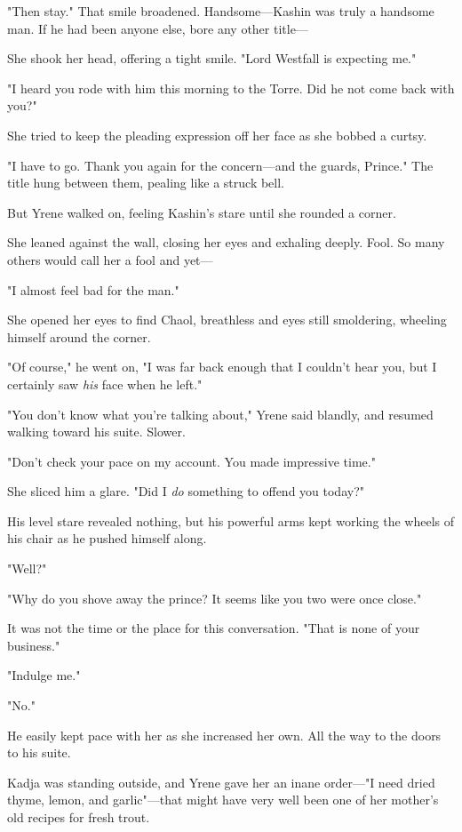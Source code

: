 "Then stay."
That smile broadened.
Handsome---Kashin was truly a handsome man.
If he had been anyone else, bore any other title---

She shook her head, offering a tight smile.
"Lord Westfall is expecting me."

"I heard you rode with him this morning to the Torre.
Did he not come back with you?"

She tried to keep the pleading expression off her face as she bobbed a curtsy.

"I have to go.
Thank you again for the concern---and the guards, Prince."
The title hung between them, pealing like a struck bell.

But Yrene walked on, feeling Kashin's stare until she rounded a corner.

She leaned against the wall, closing her eyes and exhaling deeply.
Fool.
So many others would call her a fool and yet---

"I almost feel bad for the man."

She opened her eyes to find Chaol, breathless and eyes still smoldering, wheeling himself around the corner.

"Of course," he went on, "I was far back enough that I couldn't hear you, but I certainly saw \emph{his} face when he left."

"You don't know what you're talking about," Yrene said blandly, and resumed walking toward his suite.
Slower.

"Don't check your pace on my account.
You made impressive time."

She sliced him a glare.
"Did I \emph{do} something to offend you today?"

His level stare revealed nothing, but his powerful arms kept working the wheels of his chair as he pushed himself along.

"Well?"

"Why do you shove away the prince?
It seems like you two were once close."

It was not the time or the place for this conversation.
"That is none of your business."

"Indulge me."

"No."

He easily kept pace with her as she increased her own.
All the way to the doors to his suite.

Kadja was standing outside, and Yrene gave her an inane order---"I need dried thyme, lemon, and garlic"---that might have very well been one of her mother's old recipes for fresh trout.

